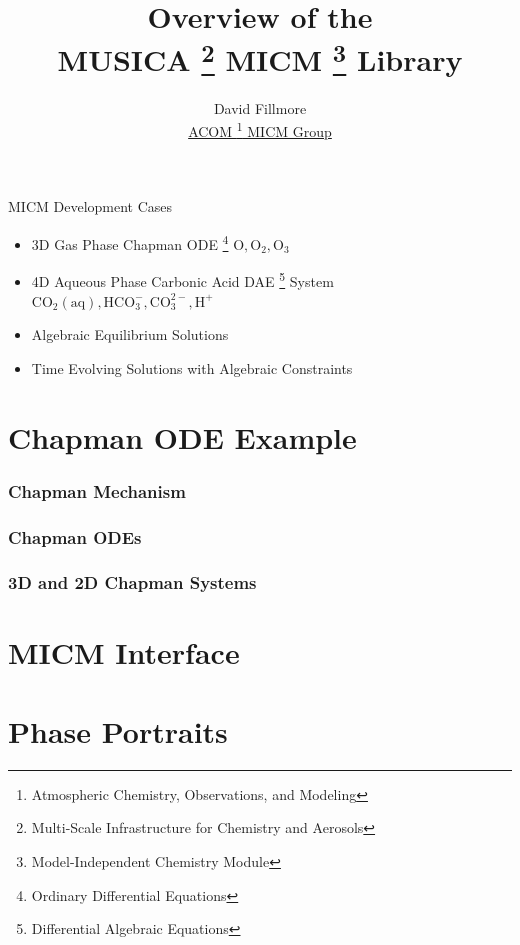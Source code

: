 \documentclass{beamer}
\title[MUSICA ODEs]{Overview of the \\
MUSICA
\footnote{Multi-Scale Infrastructure for Chemistry and Aerosols}
MICM
\footnote{Model-Independent Chemistry Module}
Library}
\author[Fillmore]{David Fillmore \\
\vspace{0.05in}
{\small \underline{ACOM
\footnote{Atmospheric Chemistry, Observations, and Modeling}
 MICM Group}}}
\begin{document}
\frame{\titlepage}

\begin{frame}
\begin{exampleblock}{MICM Development Cases}
\begin{itemize}
\item 3D Gas Phase Chapman ODE \footnote{Ordinary Differential Equations}
$\mathrm{O}, \mathrm{O_2}, \mathrm{O_3}$
\item 4D Aqueous Phase Carbonic Acid DAE \footnote{Differential Algebraic Equations} System
$\mathrm{CO_2(aq)}, \mathrm{H CO_3^-}, \mathrm{CO_3^{2-}, \mathrm{H}^+}$
\item Algebraic Equilibrium Solutions
\item Time Evolving Solutions with Algebraic Constraints
\end{itemize}
\end{exampleblock}
\end{frame}

\section{Chapman ODE Example}

\begin{frame}
\frametitle{Chapman Mechanism}

\end{frame}

\begin{frame}
\frametitle{Chapman ODEs}

\end{frame}

\begin{frame}
\frametitle{3D and 2D Chapman Systems}

\end{frame}

\section{MICM Interface}
\begin{frame}

\end{frame}

\begin{frame}

\end{frame}

\begin{frame}

\end{frame}

\section{Phase Portraits}
\begin{frame}

\end{frame}
\end{document}
